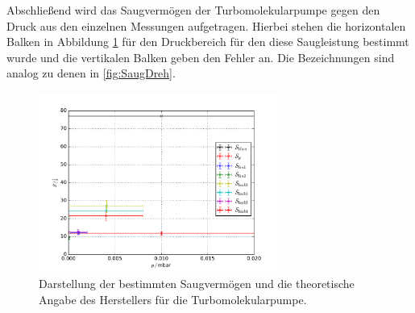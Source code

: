 Abschließend wird das Saugvermögen der Turbomolekularpumpe gegen den Druck aus den einzelnen Messungen aufgetragen. Hierbei
stehen die horizontalen Balken in Abbildung \ref{fig:SaugTurbo} für den Druckbereich für den diese Saugleistung bestimmt wurde
und die vertikalen Balken geben den Fehler an. Die Bezeichnungen sind analog zu denen in \ref{fig:SaugDreh}.
\begin{figure}[H]
  \centering
  \includegraphics[width=0.7\textwidth]{plots/SaugverTurbo.pdf}
  \caption{Darstellung der bestimmten Saugvermögen und die theoretische Angabe des Herstellers für die Turbomolekularpumpe.}
  \label{fig:SaugTurbo}
\end{figure}
